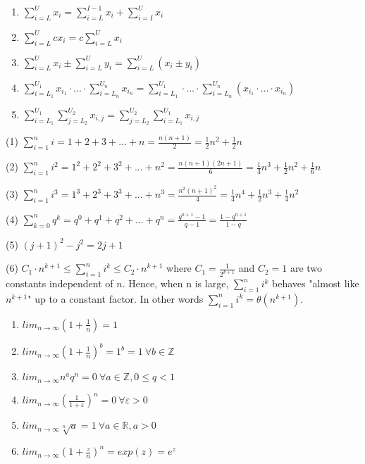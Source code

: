 \begin{enumerate}
    \item $\sum_{i=L}^Ux_i=\sum_{i=L}^{I-1}x_i+\sum_{i=I}^Ux_i$
    \item $\sum_{i=L}^Ucx_i=c\sum_{i=L}^Ux_i$
    \item $\sum_{i=L}^Ux_i\pm\sum_{i=L}^Uy_i=\sum_{i=L}^U(x_i\pm y_i)$
    \item $\sum_{i=L_1}^{U_1}x_{i_1}\cdot ... \cdot \sum_{i=L_n}^{U_n}x_{i_n}=\sum_{i=L_1}^{U_1}\cdot ... \cdot \sum_{i=L_n}^{U_n}(x_{i_1}\cdot ...\cdot x_{i_n})$
    \item $\sum_{i=L_1}^{U_1}\sum_{j=L_2}^{U_2}x_{i,j}=\sum_{j=L_2}^{U_2}\sum_{i=L_1}^{U_1}x_{i,j}$
\end{enumerate}
(1) $\sum_{i=1}^{n} i = 1 + 2 + 3 + ... + n = \frac{n(n+1)}{2} = \frac{1}{2}n^2 + \frac{1}{2}n$

(2) $\sum_{i=1}^{n} i^2 = 1^2 + 2^2 + 3^2 + ... + n^2 = \frac{n(n+1)(2n + 1)}{6} = \frac{1}{3}n^3 + \frac{1}{2}n^2 + \frac{1}{6}n$

(3) $\sum_{i=1}^{n} i^3 = 1^3 + 2^3 + 3^3 + ... + n^3 = \frac{n^2(n+1)^2}{4} = \frac{1}{4}n^4 + \frac{1}{2}n^3 + \frac{1}{4}n^2$

(4) $\sum_{k=0}^{n} q^k = q^0 + q^1 + q^2 + ... + q^n = \frac{q^{n+1}-1}{q-1}=\frac{1-q^{n+1}}{1-q}$

(5) $(j+1)^2 - j^2 = 2j + 1$

(6) $C_1 \cdot n^{k+1} \leq \sum_{i=1}^{n} i^k \leq C_2 \cdot n^{k+1}$ where $C_1 = \frac{1}{2^{k+1}}$ and $C_2 = 1$ are two constants independent of $n$. Hence, when n is large, $\sum_{i=1}^n i^k$ behaves "almost like $n^{k+1}$" up to a constant factor. In other words $\sum_{i=1}^n i^k = \theta (n^{k+1})$.

\begin{enumerate}
    \item $lim_{n\rightarrow\infty}(1 + \frac{1}{n})=1$
    \item $lim_{n\rightarrow\infty}(1 + \frac{1}{n})^b=1^b=1\ \forall b\in\mathbb{Z}$
    \item $lim_{n\rightarrow\infty}n^aq^n=0\ \forall a\in\mathbb{Z},0\leq q < 1$
    \item $lim_{n\rightarrow\infty}(\frac{1}{1+\varepsilon})^n=0\ \forall \varepsilon>0$
    \item $lim_{n\rightarrow\infty}\sqrt[n]{a}=1\ \forall a\in\mathbb{R},a>0$
    \item $lim_{n\rightarrow\infty}(1+\frac{z}{n})^n=exp(z)=e^z$
\end{enumerate}

